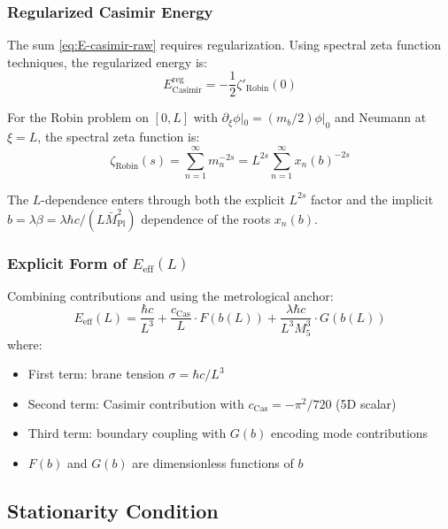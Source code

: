 \documentclass[11pt,a4paper]{article}
\begin{document}
\subsubsection{Regularized Casimir Energy}

The sum \eqref{eq:E-casimir-raw} requires regularization. Using spectral zeta
function techniques, the regularized energy is:
\begin{equation}
  E_{\text{Casimir}}^{\text{reg}} = -\frac{1}{2} \zeta'_{\text{Robin}}(0)
  \label{eq:E-casimir-reg}
\end{equation}

For the Robin problem on $[0, L]$ with $\partial_\xi \phi|_0 = (m_b/2)\phi|_0$
and Neumann at $\xi = L$, the spectral zeta function is:
\begin{equation}
  \zeta_{\text{Robin}}(s) = \sum_{n=1}^{\infty} m_n^{-2s}
                          = L^{2s} \sum_{n=1}^{\infty} x_n(b)^{-2s}
  \label{eq:zeta-robin}
\end{equation}

The $L$-dependence enters through both the explicit $L^{2s}$ factor and the
implicit $b = \lambda\beta = \lambda \hbar c/(L \bar{M}_{\text{Pl}}^2)$ dependence
of the roots $x_n(b)$.

\subsubsection{Explicit Form of $E_{\text{eff}}(L)$}

Combining contributions and using the metrological anchor:
\begin{equation}
  E_{\text{eff}}(L) = \frac{\hbar c}{L^3} + \frac{c_{\text{Cas}}}{L} \cdot F(b(L))
                    + \frac{\lambda \hbar c}{L^3 M_5^3} \cdot G(b(L))
  \label{eq:E-eff-explicit}
\end{equation}
where:
\begin{itemize}
  \item First term: brane tension $\sigma = \hbar c / L^3$
  \item Second term: Casimir contribution with $c_{\text{Cas}} = -\pi^2/720$ (5D scalar)
  \item Third term: boundary coupling with $G(b)$ encoding mode contributions
  \item $F(b)$ and $G(b)$ are dimensionless functions of $b$
\end{itemize}

\subsection{Stationarity Condition}
\end{document}
